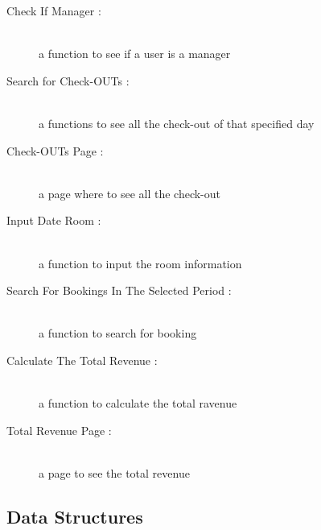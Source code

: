 \begin{description}
  \item[Check If Manager :] \hfill \\ a function to see if a user is a manager

  \item[Search for Check-OUTs :] \hfill \\ a functions to see all the check-out of that specified day

  \item[Check-OUTs Page :] \hfill \\ a page where to see all the check-out
    
  \item[Input Date Room :] \hfill \\ a function to input the room information

  \item[Search For Bookings In The Selected Period :] \hfill \\ a function to search for booking 

  \item[Calculate The Total Revenue :] \hfill \\ a function to calculate the total ravenue

  \item[Total Revenue Page :] \hfill \\ a page to see the total revenue

\end{description}

\subsection{Data Structures}
  
